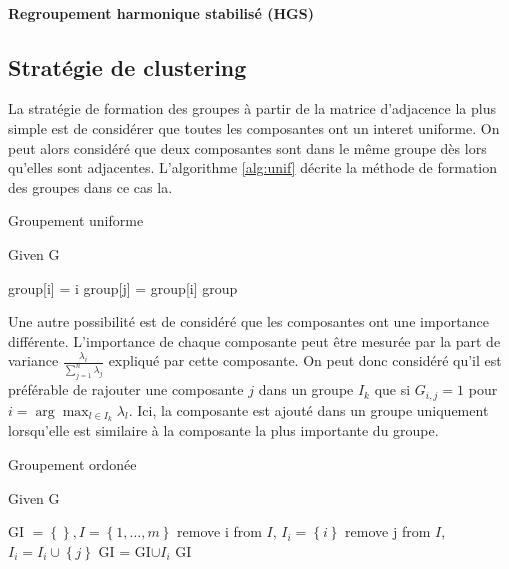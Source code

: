 \documentclass{gretsi}
\newcommand{\set}[1]{\left \{ 1, \dots, #1 \right \}}
\begin{document}
\paragraph{Regroupement harmonique stabilisé (HGS)}\label{par:HGS}


\subsection{Stratégie de clustering}
\label{sub:clust}

La stratégie de formation des groupes à partir de la matrice d'adjacence la plus simple est de considérer que toutes les composantes ont un interet uniforme. On peut alors considéré que deux composantes sont dans le même groupe dès lors qu'elles sont adjacentes. L'algorithme \ref{alg:unif} décrite la méthode de formation des groupes dans ce cas la.\\

\begin{algorithm}
\caption{Groupement uniforme}\label{alg:unif}
Given G
\begin{algorithmic}[1]
\State group[i] = i
\EndFor
{}
 group[j] = group[i]
\EndIf
\EndFor
\EndFor
\State \Return group
\end{algorithmic}
\end{algorithm}

Une autre possibilité est de considéré que les composantes ont une importance différente. L'importance de chaque composante peut être mesurée par la part de variance $\frac{\lambda_i}{\sum_{j=1}^n \lambda_j}$ expliqué par cette composante. On peut donc considéré qu'il est préférable de rajouter une composante $j$ dans un groupe $I_k$ que si $G_{i, j} = 1$ pour $i = \arg\max_{l \in I_k} \lambda_l$. Ici, la composante est ajouté dans un groupe uniquement lorsqu'elle est similaire à la composante la plus importante du groupe.

\begin{algorithm}
\caption{Groupement ordonée}\label{alg:ord}
Given G
\begin{algorithmic}[1]
\State GI $= \left \{  \right \}, I = \set{m}$
\State remove i from $I$, $I_i = \left \{ i \right \}$
\State remove j from $I$, $I_i = I_i \cup \left \{ j \right \}$
\EndIf
\EndFor
\State GI = GI$ \cup I_i$
\EndFor
\State \Return GI
\end{algorithmic}
\end{algorithm}
\end{document}
